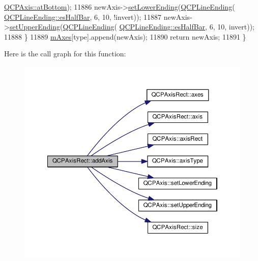 \begin{DoxyCode}
      \hyperlink{class_q_c_p_axis_ae2bcc1728b382f10f064612b368bc18aa220d68888516b6c3b493d144f1ba438f}{QCPAxis::atBottom});
11886     newAxis->\hyperlink{class_q_c_p_axis_a08af1c72db9ae4dc8cb8a973d44405ab}{setLowerEnding}(\hyperlink{class_q_c_p_line_ending}{QCPLineEnding}(
      \hyperlink{class_q_c_p_line_ending_a5ef16e6876b4b74959c7261d8d4c2cd5a126c390f0c359fcd8df1fc5e38d26d5b}{QCPLineEnding::esHalfBar}, 6, 10, !invert));
11887     newAxis->\hyperlink{class_q_c_p_axis_a69119b892fc306f651763596685aa377}{setUpperEnding}(\hyperlink{class_q_c_p_line_ending}{QCPLineEnding}(
      \hyperlink{class_q_c_p_line_ending_a5ef16e6876b4b74959c7261d8d4c2cd5a126c390f0c359fcd8df1fc5e38d26d5b}{QCPLineEnding::esHalfBar}, 6, 10, invert));
11888   \}
11889   \hyperlink{class_q_c_p_axis_rect_afe7a24d2a2bea98fc552fa826350ba81}{mAxes}[type].append(newAxis);
11890   \textcolor{keywordflow}{return} newAxis;
11891 \}
\end{DoxyCode}


Here is the call graph for this function\+:\nopagebreak
\begin{figure}[H]
\begin{center}
\leavevmode
\includegraphics[width=350pt]{class_q_c_p_axis_rect_a2dc336092ccc57d44a46194c8a23e4f4_cgraph}
\end{center}
\end{figure}




